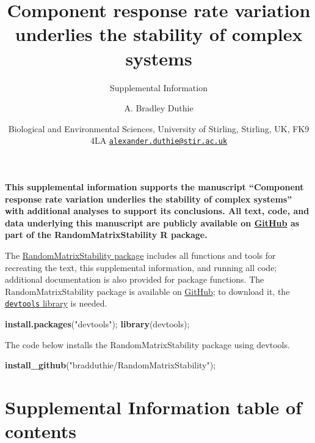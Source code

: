 \documentclass[]{article}
\title{Component response rate variation underlies the stability of complex
systems}
\subtitle{Supplemental Information}
\author{A. Bradley Duthie}
\date{Biological and Environmental Sciences, University of Stirling, Stirling,
UK, FK9 4LA
\href{mailto:alexander.duthie@stir.ac.uk}{\nolinkurl{alexander.duthie@stir.ac.uk}}}
\newenvironment{Shaded}{\begin{snugshade}}{\end{snugshade}}
\newcommand{\KeywordTok}[1]{\textcolor[rgb]{0.13,0.29,0.53}{\textbf{#1}}}
\newcommand{\StringTok}[1]{\textcolor[rgb]{0.31,0.60,0.02}{#1}}
\newcommand{\NormalTok}[1]{#1}
\begin{document}
\maketitle

\textbf{This supplemental information supports the manuscript
``Component response rate variation underlies the stability of complex
systems'' with additional analyses to support its conclusions. All text,
code, and data underlying this manuscript are publicly available on
\href{https://github.com/bradduthie/RandomMatrixStability}{GitHub} as
part of the RandomMatrixStability R package.}

The
\href{https://github.com/bradduthie/RandomMatrixStability}{RandomMatrixStability
package} includes all functions and tools for recreating the text, this
supplemental information, and running all code; additional documentation
is also provided for package functions. The RandomMatrixStability
package is available on
\href{https://github.com/bradduthie/RandomMatrixStability}{GitHub}; to
download it, the
\href{https://cran.r-project.org/web/packages/devtools/index.html}{\texttt{devtools}
library} is needed.

\begin{Shaded}
\begin{Highlighting}[]
\KeywordTok{install.packages}\NormalTok{(}\StringTok{"devtools"}\NormalTok{);}
\KeywordTok{library}\NormalTok{(devtools);}
\end{Highlighting}
\end{Shaded}

The code below installs the RandomMatrixStability package using
devtools.

\begin{Shaded}
\begin{Highlighting}[]
\KeywordTok{install_github}\NormalTok{(}\StringTok{"bradduthie/RandomMatrixStability"}\NormalTok{);}
\end{Highlighting}
\end{Shaded}

\section{Supplemental Information table of
contents}\label{supplemental-information-table-of-contents}
\end{document}
